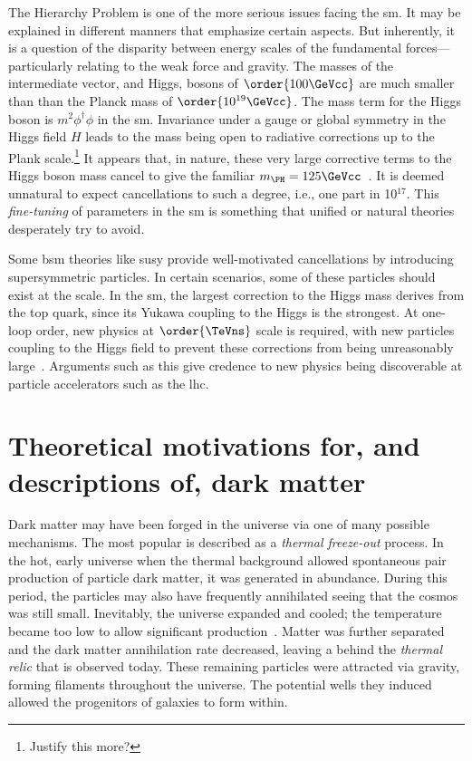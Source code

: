 The Hierarchy Problem is one of the more serious issues facing the \acrlong{sm}. It may be explained in different manners that emphasize certain aspects. But inherently, it is a question of the disparity between energy scales of the fundamental forces---particularly relating to the weak force and gravity. The masses of the intermediate vector, and Higgs, bosons of $\order{\text{100}\GeVcc}$ are much smaller than than the Planck mass of $\order{\text{10}^{19}\GeVcc}$. The mass term for the Higgs boson is $m^2 \phi^{\dagger} \phi$ in the \acrshort{sm}. Invariance under a gauge or global symmetry in the Higgs field $H$ leads to the mass being open to radiative corrections up to the Plank scale.\footnote{Justify this more?} It appears that, in nature, these very large corrective terms to the Higgs boson mass cancel to give the familiar $m_{\PH} = \text{125}\GeVcc$~\cite{Chatrchyan:2012xdj,Aad:2012tfa}. It is deemed unnatural to expect cancellations to such a degree, i.e., one part in 10$^{17}$. This \emph{fine-tuning} of parameters in the \acrlong{sm} is something that unified or natural theories desperately try to avoid.

Some \acrshort{bsm} theories like \acrlong{susy} provide well-motivated cancellations by introducing supersymmetric particles. In certain scenarios, some of these particles should exist at the \TeVns scale. In the \acrshort{sm}, the largest correction to the Higgs mass derives from the top quark, since its Yukawa coupling to the Higgs is the strongest. At one-loop order, new physics at $\order{\TeVns}$ scale is required, with new particles coupling to the Higgs field to prevent these corrections from being unreasonably large~\cite{Farina:2013ssa}. Arguments such as this give credence to new physics being discoverable at particle accelerators such as the \acrlong{lhc}.




\section{Theoretical motivations for, and descriptions of, dark matter}
\label{sec:theory_dark_matter}


Dark matter may have been forged in the universe via one of many possible mechanisms. The most popular is described as a \emph{thermal freeze-out} process. In the hot, early universe when the thermal background allowed spontaneous pair production of particle dark matter, it was generated in abundance. During this period, the particles may also have frequently annihilated seeing that the cosmos was still small. Inevitably, the universe expanded and cooled; the temperature became too low to allow significant production~\cite{Baldes:2017gzw}. Matter was further separated and the dark matter annihilation rate decreased, leaving a behind the \emph{thermal relic} that is observed today. These remaining particles were attracted via gravity, forming filaments throughout the universe. The potential wells they induced allowed the progenitors of galaxies to form within.


